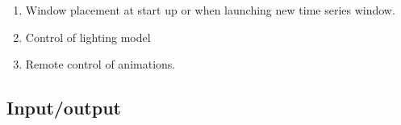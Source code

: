 \documentclass[11pt]{article}
\newcommand{\eg}{{\em e.g.,}}
\newcommand{\map}{\emph{map3d}}
\newcommand{\mapgl}{\emph{map3dGL}}
\begin{document}
\begin{enumerate}
  \item Window placement at start up or when launching new time series
        window. 
  \item Control of lighting model
  \item Remote control of animations.
\end{enumerate}

\subsection{Input/output}
\end{document}
